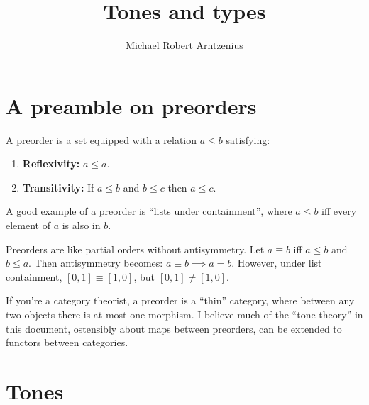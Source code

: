 \documentclass{article}
\title{Tones and types}
\author{Michael Robert Arntzenius}
\date{\todo{16 November 2017 -- ???}}
\newcommand{\bnfeq}{\dblcolon=}
\newcommand{\ms}[1]{\ensuremath{\mathsf{#1}}}
\newcommand{\GG}{\Gamma}
\newcommand{\op}{\ms{op}}
\newcommand{\iso}{\ms{core}}
\renewcommand{\path}{\ms{path}}
\newcommand{\tm}{{\ms{id}}}     %
\newcommand{\ta}{{\color{ForestGreen}\ensuremath{\op}}}    %
\newcommand{\ti}{{\color{NavyBlue}\ensuremath{\iso}}} %
\newcommand{\tb}{{\color{Bittersweet}\ensuremath{\path}}}  %
\newcommand{\h}[3]{#1 : {#2}}
\begin{document}
\maketitle


\section{A preamble on preorders}

A preorder is a set equipped with a relation $a \le b$ satisfying: 
\begin{enumerate}
\item \textbf{Reflexivity:} $a \le a$.
\item \textbf{Transitivity:} If $a \le b$ and $b \le c$ then $a \le c$.
\end{enumerate}

A good example of a preorder is ``lists under containment'', where $a \le b$ iff
every element of $a$ is also in $b$.

Preorders are like partial orders without antisymmetry. Let $a \equiv b$ iff $a
\le b$ and $b \le a$. Then antisymmetry becomes: $a \equiv b \implies a = b$.
However, under list containment, $[0,1] \equiv [1,0]$, but $[0,1] \ne [1,0]$.

If you're a category theorist, a preorder is a ``thin'' category, where between
any two objects there is at most one morphism. I believe much of the ``tone
theory'' in this document, ostensibly about maps between preorders, can be
extended to functors between categories.



\section{Tones}
\end{document}
